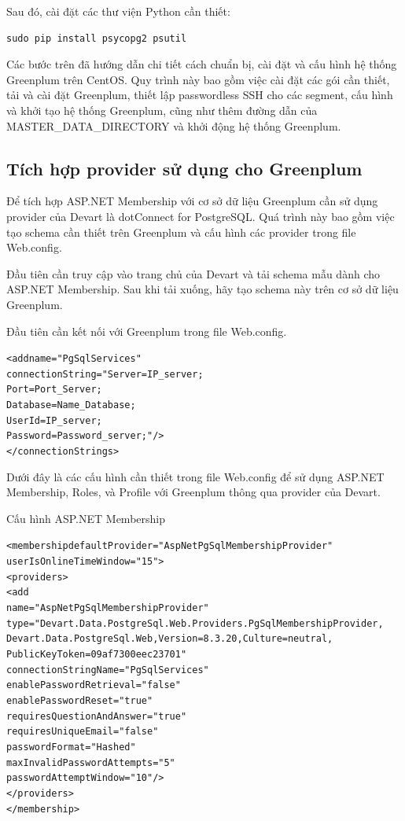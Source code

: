 \documentclass[14pt]{article}
\begin{document}
Sau đó, cài đặt các thư viện Python cần thiết:

\begin{verbatim}
sudo pip install psycopg2 psutil
\end{verbatim}

Các bước trên đã hướng dẫn chi tiết cách chuẩn bị, cài đặt và cấu hình hệ thống Greenplum trên CentOS. Quy trình này bao gồm việc cài đặt các gói cần thiết, tải và cài đặt Greenplum, thiết lập passwordless SSH cho các segment, cấu hình và khởi tạo hệ thống Greenplum, cũng như thêm đường dẫn của MASTER\_DATA\_DIRECTORY và khởi động hệ thống Greenplum.



\subsection{Tích hợp provider sử dụng cho Greenplum}

Để tích hợp ASP.NET Membership với cơ sở dữ liệu Greenplum cần sử dụng provider của Devart là dotConnect for PostgreSQL. Quá trình này bao gồm việc tạo schema cần thiết trên Greenplum và cấu hình các provider trong file Web.config.

Đầu tiên cần truy cập vào trang chủ của Devart và tải schema mẫu dành cho ASP.NET Membership. Sau khi tải xuống, hãy tạo schema này trên cơ sở dữ liệu Greenplum.

Đầu tiên cần kết nối với Greenplum trong file Web.config.


\begin{mdframed}[backgroundcolor=white, linecolor=black, roundcorner=5pt]
\begin{alltt}
<add name="PgSqlServices" 
     connectionString="Server=IP_server;
                       Port=Port_Server;
                       Database=Name_Database;
                       User Id=IP_server;
                       Password=Password_server;"/>
</connectionStrings>
\end{alltt}
\end{mdframed}

Dưới đây là các cấu hình cần thiết trong file Web.config để sử dụng ASP.NET Membership, Roles, và Profile với Greenplum thông qua provider của Devart.

Cấu hình ASP.NET Membership
\begin{mdframed}[backgroundcolor=white, linecolor=black, roundcorner=5pt]
\begin{alltt}
<membership defaultProvider="AspNetPgSqlMembershipProvider"
            userIsOnlineTimeWindow="15">
  <providers>
    <add
      name="AspNetPgSqlMembershipProvider"
      type="Devart.Data.PostgreSql.Web.Providers.PgSqlMembershipProvider,
            Devart.Data.PostgreSql.Web, Version=8.3.20, Culture=neutral,
            PublicKeyToken=09af7300eec23701"
      connectionStringName="PgSqlServices"
      enablePasswordRetrieval="false"
      enablePasswordReset="true"
      requiresQuestionAndAnswer="true"
      requiresUniqueEmail="false"
      passwordFormat="Hashed"
      maxInvalidPasswordAttempts="5"
      passwordAttemptWindow="10" />
  </providers>
</membership>
\end{alltt}
\end{mdframed}
\end{document}

